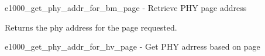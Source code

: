 e1000\_\-get\_\-phy\_\-addr\_\-for\_\-bm\_\-page -\/ Retrieve PHY page address

Returns the phy address for the page requested.

e1000\_\-get\_\-phy\_\-addr\_\-for\_\-hv\_\-page -\/ Get PHY adrress based on page 